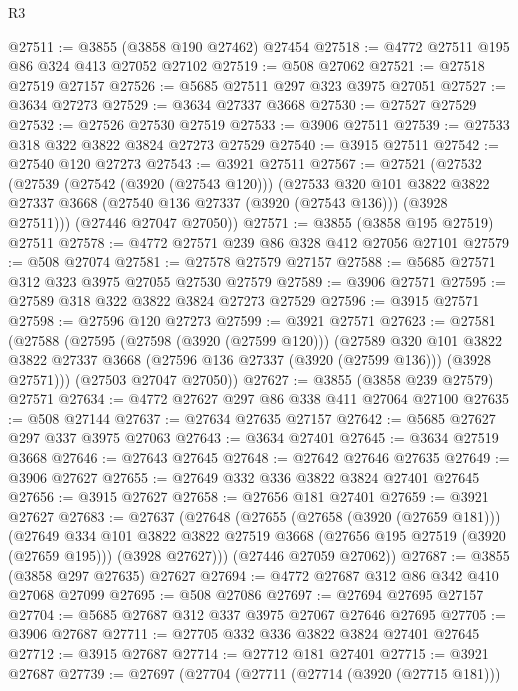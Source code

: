 \begin{lexlean}{R3}
\begin{coremodule}
@27511 := @3855 (@3858 @190 @27462) @27454
@27518 := @4772 @27511 @195 @86 @324 @413 @27052 @27102
@27519 := @508 @27062
@27521 := @27518 @27519 @27157
@27526 := @5685 @27511 @297 @323 @3975 @27051
@27527 := @3634 @27273
@27529 := @3634 @27337 @3668
@27530 := @27527 @27529
@27532 := @27526 @27530 @27519
@27533 := @3906 @27511
@27539 := @27533 @318 @322 @3822 @3824 @27273 @27529
@27540 := @3915 @27511
@27542 := @27540 @120 @27273
@27543 := @3921 @27511
@27567 := @27521
    (@27532
      (@27539
        (@27542 (@3920 (@27543 @120)))
        (@27533
          @320
          @101
          @3822
          @3822
          @27337
          @3668
          (@27540 @136 @27337 (@3920 (@27543 @136)))
          (@3928 @27511)))
      (@27446 @27047 @27050))
@27571 := @3855 (@3858 @195 @27519) @27511
@27578 := @4772 @27571 @239 @86 @328 @412 @27056 @27101
@27579 := @508 @27074
@27581 := @27578 @27579 @27157
@27588 := @5685 @27571 @312 @323 @3975 @27055 @27530 @27579
@27589 := @3906 @27571
@27595 := @27589 @318 @322 @3822 @3824 @27273 @27529
@27596 := @3915 @27571
@27598 := @27596 @120 @27273
@27599 := @3921 @27571
@27623 := @27581
    (@27588
      (@27595
        (@27598 (@3920 (@27599 @120)))
        (@27589
          @320
          @101
          @3822
          @3822
          @27337
          @3668
          (@27596 @136 @27337 (@3920 (@27599 @136)))
          (@3928 @27571)))
      (@27503 @27047 @27050))
@27627 := @3855 (@3858 @239 @27579) @27571
@27634 := @4772 @27627 @297 @86 @338 @411 @27064 @27100
@27635 := @508 @27144
@27637 := @27634 @27635 @27157
@27642 := @5685 @27627 @297 @337 @3975 @27063
@27643 := @3634 @27401
@27645 := @3634 @27519 @3668
@27646 := @27643 @27645
@27648 := @27642 @27646 @27635
@27649 := @3906 @27627
@27655 := @27649 @332 @336 @3822 @3824 @27401 @27645
@27656 := @3915 @27627
@27658 := @27656 @181 @27401
@27659 := @3921 @27627
@27683 := @27637
    (@27648
      (@27655
        (@27658 (@3920 (@27659 @181)))
        (@27649
          @334
          @101
          @3822
          @3822
          @27519
          @3668
          (@27656 @195 @27519 (@3920 (@27659 @195)))
          (@3928 @27627)))
      (@27446 @27059 @27062))
@27687 := @3855 (@3858 @297 @27635) @27627
@27694 := @4772 @27687 @312 @86 @342 @410 @27068 @27099
@27695 := @508 @27086
@27697 := @27694 @27695 @27157
@27704 := @5685 @27687 @312 @337 @3975 @27067 @27646 @27695
@27705 := @3906 @27687
@27711 := @27705 @332 @336 @3822 @3824 @27401 @27645
@27712 := @3915 @27687
@27714 := @27712 @181 @27401
@27715 := @3921 @27687
@27739 := @27697
    (@27704
      (@27711
        (@27714 (@3920 (@27715 @181)))

\end{coremodule}
\end{lexlean}
